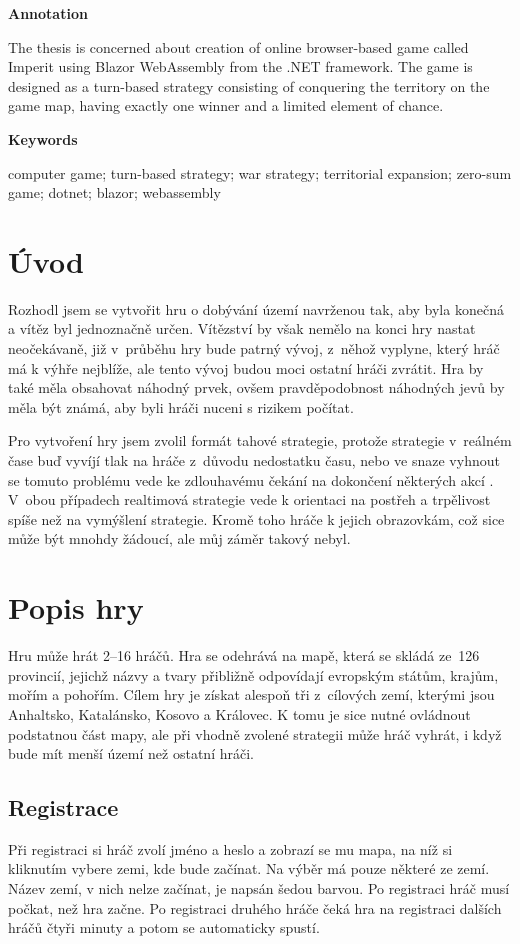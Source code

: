 \documentclass[a4paper,12pt]{article}
\begin{document}
\Large\textbf{Annotation}\normalsize

The thesis is concerned about creation of online browser-based game called Imperit using Blazor WebAssembly from the .NET framework. The game is designed as a turn-based strategy consisting of conquering the territory on the game map, having exactly one winner and a limited element of chance.

\Large\textbf{Keywords}\normalsize

computer game; turn-based strategy; war strategy; territorial expansion; zero-sum game;\- dotnet; blazor; webassembly
\newpage
\thispagestyle{empty}
\tableofcontents
\newpage
\section{Úvod}
Rozhodl jsem se vytvořit hru o dobývání území navrženou tak, aby byla konečná a vítěz byl jednoznačně určen. Vítězství by však nemělo na konci hry nastat neočekávaně, již v~průběhu hry bude patrný vývoj, z~něhož vyplyne, který hráč má k výhře nejblíže, ale tento vývoj budou moci ostatní hráči zvrátit. Hra by také měla obsahovat náhodný prvek, ovšem pravděpodobnost náhodných jevů by měla být známá, aby byli hráči nuceni s rizikem počítat.

Pro vytvoření hry jsem zvolil formát tahové strategie, protože strategie v~reálném čase buď vyvíjí tlak na hráče z~důvodu nedostatku času, nebo ve snaze vyhnout se tomuto problému vede ke zdlouhavému čekání na dokončení některých akcí \cite{turnreal1}. V~obou případech realtimová strategie vede k orientaci na postřeh a trpělivost spíše než na vymýšlení strategie\cite{turnreal2}. Kromě toho  hráče k jejich obrazovkám, což sice může být mnohdy žádoucí, ale můj záměr takový nebyl.

\section{Popis hry}
Hru může hrát 2--16 hráčů. Hra se odehrává na mapě, která se skládá ze~126 provincií, jejichž názvy a tvary přibližně odpovídají evropským státům, krajům, mořím a pohořím. Cílem hry je získat alespoň tři z~cílových zemí, kterými jsou Anhaltsko, Katalánsko, Kosovo a Královec. K tomu je sice nutné ovládnout podstatnou část mapy, ale při vhodně zvolené strategii může hráč vyhrát, i když bude mít menší území než ostatní hráči.
\subsection{Registrace}
Při registraci si hráč zvolí jméno a heslo a zobrazí se mu mapa, na níž si kliknutím vybere zemi, kde bude začínat. Na výběr má pouze některé ze zemí. Název zemí, v nich nelze začínat, je napsán šedou barvou. Po registraci hráč musí počkat, než hra začne. Po registraci druhého hráče čeká hra na registraci dalších hráčů čtyři minuty a potom se automaticky spustí.
\end{document}
